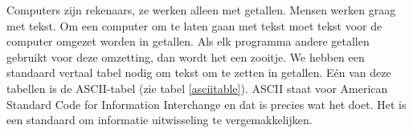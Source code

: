 Computers zijn rekenaars, ze werken alleen met getallen. Mensen werken graag met tekst. Om een computer om te laten gaan met tekst moet tekst voor de computer omgezet worden in getallen. Als elk programma andere getallen gebruikt voor deze omzetting, dan wordt het een zooitje. We hebben een standaard vertaal tabel nodig om tekst om te zetten in getallen. E\'en van deze tabellen is de ASCII-tabel (zie tabel \ref{asciitable}). ASCII staat voor American Standard Code for Information Interchange en dat is precies wat het doet. Het is een standaard om informatie uitwisseling te vergemakkelijken.
